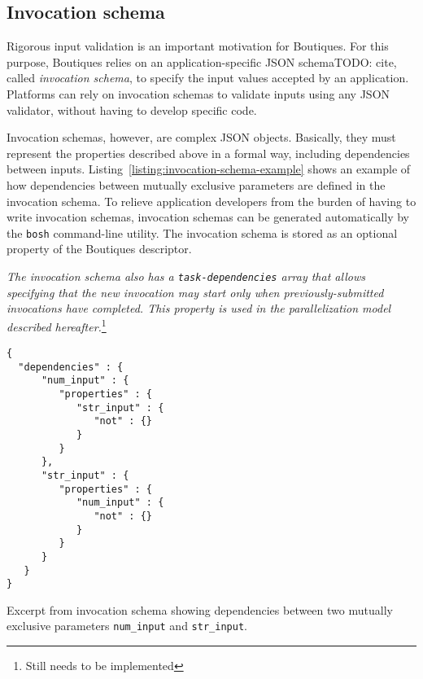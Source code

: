 \documentclass{article}
\newcommand{\todo}[1]{\color{red}TODO: #1\color{black}}
\newcommand{\boutiques}{Boutiques\xspace}
\newcommand{\notimplementedyet}[1]{\color{blue}\emph{#1}\footnote{Still needs to be implemented}\color{black}\xspace}
\begin{document}
\subsection{Invocation schema}
\label{sec:invocation-schema}

Rigorous input validation is an important motivation for
\boutiques. For this purpose, \boutiques relies on an
application-specific JSON schema\todo{cite}, called \emph{invocation schema}, to
specify the input values accepted by an application. Platforms can
rely on invocation schemas to validate inputs using
any JSON validator, without having to develop specific code.

Invocation schemas, however, are complex JSON objects. Basically, they
must represent the properties described above in a formal way,
including dependencies between
inputs. Listing~\ref{listing:invocation-schema-example} shows an
example of how dependencies between mutually exclusive parameters are
defined in the invocation schema. To relieve application developers
from the burden of having to write invocation schemas, invocation
schemas can be generated automatically by the \texttt{bosh}
command-line utility. The invocation schema is stored as an optional
property of the \boutiques descriptor.

\notimplementedyet{The invocation schema also has a
 \texttt{task-dependencies} array that allows specifying that the new
 invocation may start only when previously-submitted invocations have
 completed. This property is used in the parallelization model
 described hereafter.}



\begin{listing}
\begin{verbatim}
{
  "dependencies" : {
      "num_input" : {
         "properties" : {
            "str_input" : {
               "not" : {}
            }
         }
      },
      "str_input" : {
         "properties" : {
            "num_input" : {
               "not" : {}
            }
         }
      }
   }
}
\end{verbatim}
\caption{Excerpt from invocation schema showing dependencies between
  two mutually exclusive parameters \texttt{num\_input} and
  \texttt{str\_input}.}
\label{listing:invocation-schema-example}
\end{listing}
\end{document}
